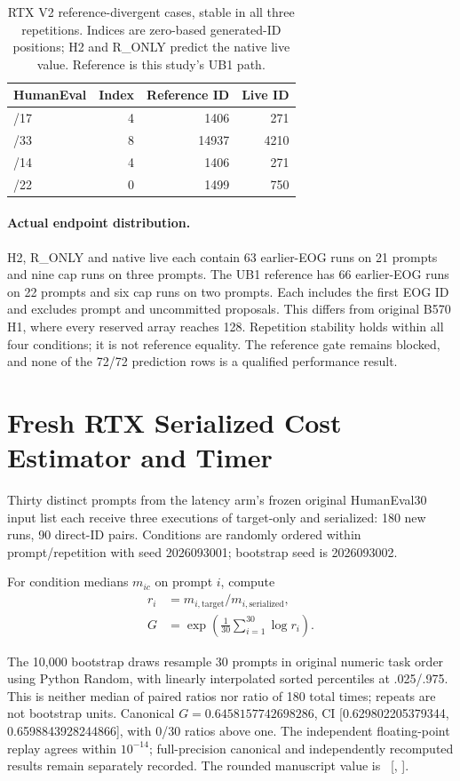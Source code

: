 \begin{table}[t]
\caption{RTX V2 reference-divergent cases, stable in all three repetitions. Indices are zero-based generated-ID positions; H2 and R\_ONLY predict the native live value. Reference is this study's UB1 path.}
\label{tab:rtxdivergences}
\centering
\begin{tabular}{lrrr}
\toprule
HumanEval & Index & Reference ID & Live ID \\
\midrule
/17 & 4 & 1406 & 271 \\
/33 & 8 & 14937 & 4210 \\
/14 & 4 & 1406 & 271 \\
/22 & 0 & 1499 & 750 \\
\bottomrule
\end{tabular}
\end{table}

\paragraph{Actual endpoint distribution.}
H2, R\_ONLY and native live each contain 63 earlier-EOG runs on 21 prompts and nine cap runs on three prompts. The UB1 reference has 66 earlier-EOG runs on 22 prompts and six cap runs on two prompts. Each includes the first EOG ID and excludes prompt and uncommitted proposals. This differs from original B570 H1, where every reserved array reaches 128. Repetition stability holds within all four conditions; it is not reference equality. The reference gate remains blocked, and none of the 72/72 prediction rows is a qualified performance result.

\section{Fresh RTX Serialized Cost Estimator and Timer}
Thirty distinct prompts from the latency arm's frozen original HumanEval30 input list each receive three executions of target-only and serialized: 180 new runs, 90 direct-ID pairs. Conditions are randomly ordered within prompt/repetition with seed 2026093001; bootstrap seed is 2026093002.

\begin{samepage}
For condition medians $m_{ic}$ on prompt $i$, compute
\[
\begin{aligned}
r_i&=m_{i,\mathrm{target}}/m_{i,\mathrm{serialized}},\\
G&=\exp\!\left(\frac1{30}\sum_{i=1}^{30}\log r_i\right).
\end{aligned}
\]
\end{samepage}
The 10,000 bootstrap draws resample 30 prompts in original numeric task order using Python Random, with linearly interpolated sorted percentiles at .025/.975. This is neither median of paired ratios nor ratio of 180 total times; repeats are not bootstrap units. Canonical $G=0.6458157742698286$, CI [0.629802205379344, 0.6598843928244866], with 0/30 ratios above one. The independent floating-point replay agrees within $10^{-14}$; full-precision canonical and independently recomputed results remain separately recorded. The rounded manuscript value is \FUCost\ [\FUCostLo, \FUCostHi].

